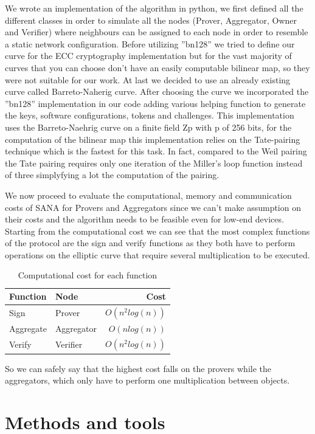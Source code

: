 \documentclass[10pt, a4paper, twocolumn]{article} %
\begin{document}
We wrote an implementation of the algorithm in python, we first defined all the different classes in order to simulate all the nodes (Prover, Aggregator, Owner and Verifier) where neighbours can be assigned to each node in order to resemble a static network configuration.
Before utilizing ''bn128'' we tried to define our curve for the ECC cryptography implementation but for the vast majority of curves that you can choose don't have an easily computable bilinear map, so they were not suitable for our work. At last we decided to use an already existing curve called Barreto-Naherig curve.
After choosing the curve we incorporated the ''bn128'' implementation in our code adding various helping function to generate the keys, software configurations, tokens and challenges.
This implementation uses the Barreto-Naehrig curve on a finite field Zp with p of 256 bits, for the computation of the bilinear map this implementation relies on the Tate-pairing technique which is the fastest for this task. In fact, compared to the Weil pairing the Tate pairing requires only one iteration of the Miller's loop function instead of three simplyfying a lot the computation of the pairing.

We now proceed to evaluate the computational, memory and communication costs of SANA for Provers and Aggregators since we can't make assumption on their costs and the algorithm needs to be feasible even for low-end devices.
Starting from the computational cost we can see that the most complex functions of the protocol are the sign and verify functions as they both have to perform operations on the elliptic curve that require several multiplication to be executed.
\begin{table}
	\caption{Computational cost for each function}
	\centering
	\begin{tabular}{llr}
		\toprule
		Function & Node & Cost \\
		\midrule
		Sign & Prover & $O(n^2log(n))$ \\
		Aggregate & Aggregator & $O(n log(n))$ \\
		Verify & Verifier & $O(n^2log(n))$ \\
		\bottomrule
	\end{tabular}
\end{table}
So we can safely say that the highest cost falls on the provers while the aggregators, which only have to perform one multiplication between objects.

\section{Methods and tools}
\end{document}
